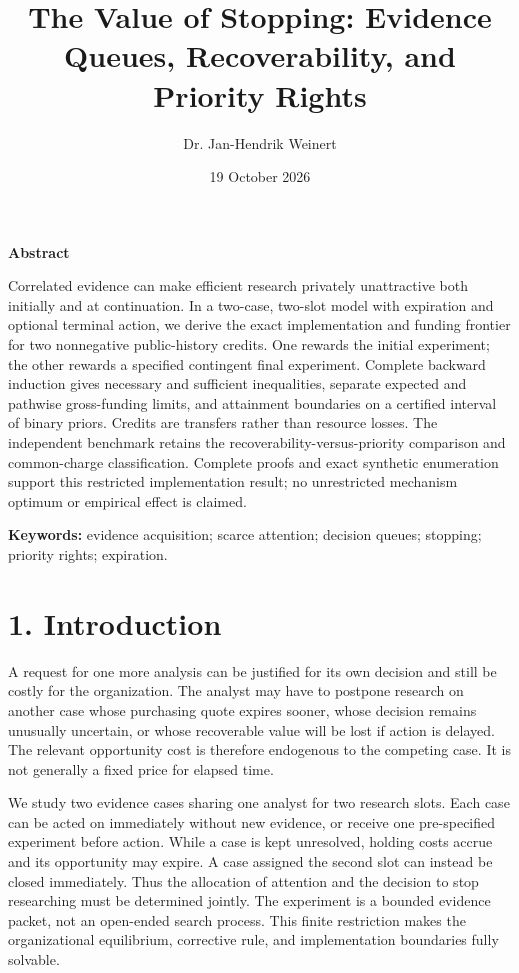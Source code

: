 \documentclass[
  11pt,
]{article}
\title{The Value of Stopping: Evidence Queues, Recoverability, and
Priority Rights}
\author{Dr. Jan-Hendrik Weinert}
\date{19 October 2026}
\makeatletter
\renewcommand{\maketitle}{%
  \begin{center}
  {\LARGE\bfseries\@title\par}
  \vspace{0.8em}
  {\normalsize\@author\par}
  \vspace{0.35em}
  {\small\@date\par}
  \end{center}
  \vspace{0.4em}}
\renewenvironment{abstract}{%
  \begin{center}\small\bfseries Abstract\end{center}
  \begin{list}{}{\setlength{\leftmargin}{0.5in}\setlength{\rightmargin}{0.5in}}
  \item[]\small\setlength{\parindent}{0pt}\ignorespaces
}{\end{list}\vspace{0.6em}}
\makeatother
\begin{document}
\maketitle
\begin{abstract}
Correlated evidence can make efficient research privately unattractive both initially and at continuation. In a two-case, two-slot model with expiration and optional terminal action, we derive the exact implementation and funding frontier for two nonnegative public-history credits. One rewards the initial experiment; the other rewards a specified contingent final experiment. Complete backward induction gives necessary and sufficient inequalities, separate expected and pathwise gross-funding limits, and attainment boundaries on a certified interval of binary priors. Credits are transfers rather than resource losses. The independent benchmark retains the recoverability-versus-priority comparison and common-charge classification. Complete proofs and exact synthetic enumeration support this restricted implementation result; no unrestricted mechanism optimum or empirical effect is claimed.
\end{abstract}
\noindent\small \textbf{Keywords:} evidence acquisition; scarce attention; decision
queues; stopping; priority rights; expiration.\par\normalsize
\vspace{0.6em}
\section{1. Introduction}\label{introduction}

A request for one more analysis can be justified for its own decision
and still be costly for the organization. The analyst may have to
postpone research on another case whose purchasing quote expires sooner,
whose decision remains unusually uncertain, or whose recoverable value
will be lost if action is delayed. The relevant opportunity cost is
therefore endogenous to the competing case. It is not generally a fixed
price for elapsed time.

We study two evidence cases sharing one analyst for two research slots.
Each case can be acted on immediately without new evidence, or receive
one pre-specified experiment before action. While a case is kept
unresolved, holding costs accrue and its opportunity may expire. A case
assigned the second slot can instead be closed immediately. Thus the
allocation of attention and the decision to stop researching must be
determined jointly. The experiment is a bounded evidence packet, not an
open-ended search process. This finite restriction makes the
organizational equilibrium, corrective rule, and implementation
boundaries fully solvable.
\end{document}
